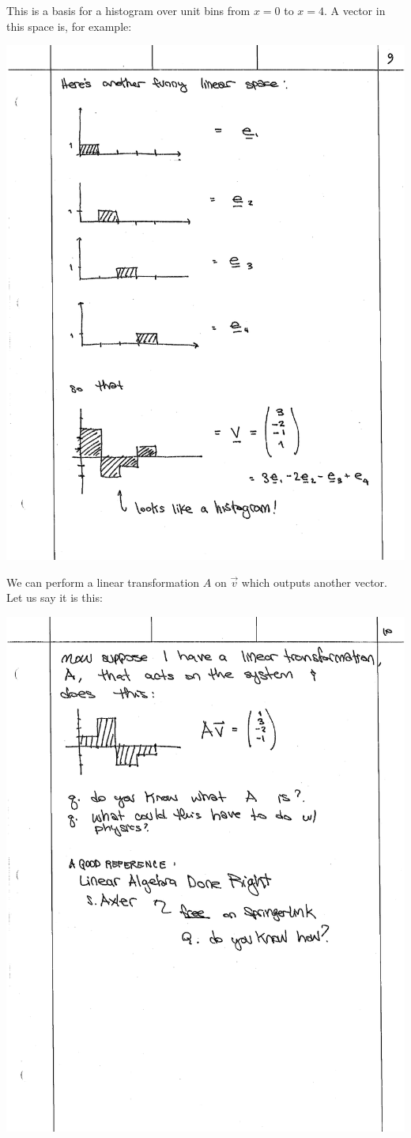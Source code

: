 \documentclass[12pt, oneside]{report}    %
\begin{document}
\noindent This is a basis for a histogram over unit bins from $x=0$ to $x=4$. A vector in this space is, for example:

\begin{center}
\includegraphics[width=.8\textwidth]{figures/lec02_hist.pdf}
\end{center}

\noindent We can perform a linear transformation $A$ on $\vec{v}$ which outputs another vector. Let us say it is this:
\begin{center}
\includegraphics[width=.8\textwidth]{figures/lec02_hist2.pdf}
\end{center}
\end{document}

